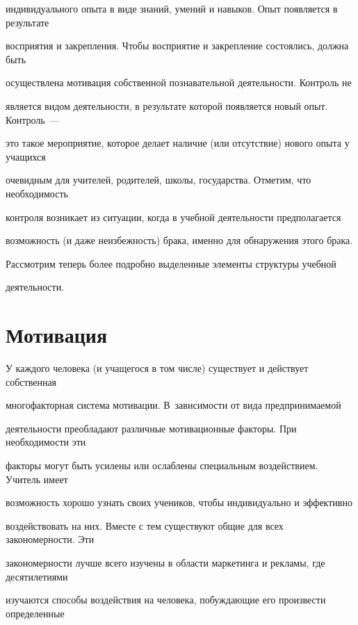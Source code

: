 индивидуального опыта в виде знаний, умений и навыков. Опыт появляется в результате 


восприятия и закрепления. Чтобы восприятие и закрепление состоялись, должна быть 


осуществлена мотивация собственной познавательной деятельности. Контроль не 


является видом деятельности, в результате которой появляется новый опыт. Контроль~--- 


это такое мероприятие, которое делает наличие (или отсутствие) нового опыта у учащихся 


очевидным для учителей, родителей, школы, государства. Отметим, что необходимость 


контроля возникает из ситуации, когда в учебной деятельности предполагается 


возможность (и даже неизбежность) брака, именно для обнаружения этого брака.





Рассмотрим теперь более подробно выделенные элементы структуры учебной 


деятельности.





\section{Мотивация}





У каждого человека (и учащегося в том числе) существует и действует собственная 


многофакторная система мотивации. В~зависимости от вида предпринимаемой 


деятельности преобладают различные мотивационные факторы. При необходимости эти 


факторы могут быть усилены или ослаблены специальным воздействием. Учитель имеет 


возможность хорошо узнать своих учеников, чтобы индивидуально и эффективно 


воздействовать на них. Вместе с тем существуют общие для всех закономерности. Эти 


закономерности лучше всего изучены в об\-ласти маркетинга и рекламы, где десятилетиями 


изучаются способы воздействия на человека, побуждающие его произвести определенные 


